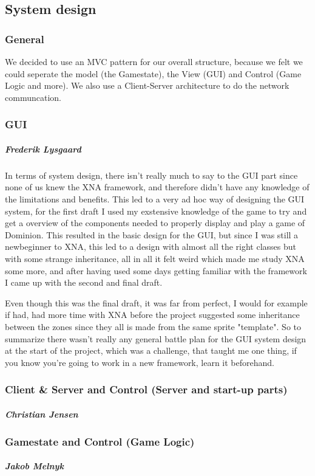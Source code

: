 \subsection{System design}
\subsubsection{General}
We decided to use an MVC pattern for our overall structure, because we felt we could seperate the model (the Gamestate), the View (GUI) and Control (Game Logic and more). We also use a Client-Server architecture to do the network communcation.

\subsubsection{GUI}
\subparagraph{Frederik Lysgaard}
In terms of system design, there isn't really much to say to the GUI part since none of us knew the XNA framework, and therefore didn't have any knowledge of the limitations and benefits.
This led to a very ad hoc way of designing the GUI system, for the first draft I used my exstensive knowledge of the game to try and get a overview of the components needed to properly display and play a game of Dominion. 
This resulted in the basic design for the GUI, but since I was still a newbeginner to XNA, this led to a design with almost all the right classes but with some strange inheritance, all in all it felt weird which made me study XNA some more, and after having used some days getting familiar with the framework I came up with the second and final draft.

Even though this was the final draft, it was far from perfect, I would for example if had, had more time with XNA before the project suggested some inheritance between the zones since they all is made from the same sprite "template". So to summarize there wasn't really any general battle plan for the GUI system design at the start of the project, which was a challenge, that taught me one thing,
if you know you're going to work in a new framework, learn it beforehand.

\subsubsection{Client \& Server and Control (Server and start-up parts)}
\subparagraph{Christian Jensen}

\subsubsection{Gamestate and Control (Game Logic)}
\subparagraph{Jakob Melnyk}


